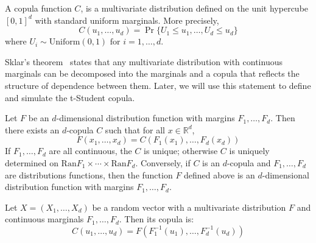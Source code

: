 \documentclass[11pt,fleqn]{book} %
\begin{document}
\begin{definition}[Copula]
	A copula function $C$, is a multivariate distribution defined on the 
	unit hypercube $[0,1]^d$ with standard uniform marginals. 
	More precisely,
	\begin{displaymath}
		C(u_1, \dots, u_d) = \Pr\{U_1 \le u_1, \dots, U_d \le u_d\}
	\end{displaymath}
	where $U_i \sim \text{Uniform}(0,1) \text{ for } i = 1,\dots, d$.
\end{definition}

Sklar's theorem~\cite{sklar:1959} states that any multivariate 
distribution with continuous marginals can be decomposed into the marginals and 
a copula that reflects the structure of dependence between them. Later, we will 
use this statement to define and simulate the t-Student copula.

\begin{theorem}
	\label{thm:sklar}
	Let $F$ be an $d$-dimensional distribution function with margins $F_1,\dots,F_d$.
	Then there exists an $d$-copula $C$ such that for all $x \in \mathbb{R}^d$,
	\begin{displaymath}
		F(x_1,\dots,x_d) = C(F_1(x_1),\dots,F_d(x_d))
	\end{displaymath}
	If $F_1,\dots,F_d$ are all continuous, the $C$ is unique; otherwise $C$ is uniquely
	determined on $\text{Ran}F_1 \times \cdots \times \text{Ran}F_d$.
	Conversely, if $C$ is an $d$-copula and $F_1,\dots,F_d$ are distributions functions,
	then the function $F$ defined above is an $d$-dimensional distribution function
	with margins $F_1,\dots,F_d$.
\end{theorem}

\begin{corollary}
	\label{cor:cop1}
	Let $X=(X_1, \dots, X_d)$ be a random vector with a multivariate 
	distribution $F$ and continuous marginals $F_1, \dots, F_d$. 
	Then its copula is:
	\begin{displaymath}
		C(u_1,\dots,u_d) = F(F_1^{-1}(u_1), \dots, F_d^{-1}(u_d))
	\end{displaymath}
\end{corollary}
\end{document}
